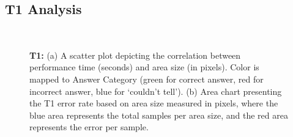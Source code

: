\subsection{T1 Analysis}
\begin{figure}[p]
\centering
{} \\ \vspace{-0.35cm}
\caption{\textbf{T1:} (a) A scatter plot depicting the correlation between performance time (seconds) and area size (in pixels). Color is mapped to Answer Category (green for correct answer, red for incorrect answer, blue for `couldn't tell'). (b) Area chart presenting the T1 error rate based on area size measured in pixels, where the blue area represents the total samples per area size, and the red area represents the error per sample.} \label{fig:t1results}
\end{figure}
